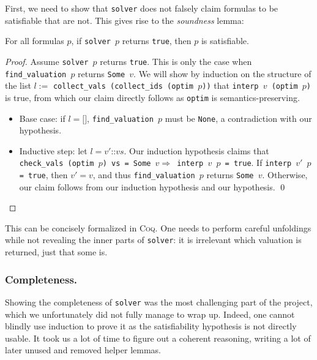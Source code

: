 First, we need to show that \texttt{solver} does not falsely claim formulas to be satisfiable that are not.
This gives rise to the \emph{soundness} lemma:
\begin{lemma}
    For all formulas $p$, if \texttt{solver $p$} returns \texttt{true}, then $p$ is satisfiable.
\end{lemma}
\begin{proof}
    Assume \texttt{solver $p$} returns \texttt{true}.
    This is only the case when \texttt{find\_valuation $p$} returns \texttt{Some $v$}.
    We will show by induction on the structure of the list $l :=$ \texttt{collect\_vals (collect\_ids (optim $p$))} that \texttt{interp $v$ (optim $p$)} is true, from which our claim directly follows as \texttt{optim} is semantics-preserving.
    \begin{itemize}
        \item Base case: if $l = \texttt{[]}$, \texttt{find\_valuation $p$} must be \texttt{None}, a contradiction with our hypothesis.
        \item Inductive step: let $l = \texttt{$v'$::$vs$}$.
        Our induction hypothesis claims that \texttt{check\_vals (optim $p$) vs = Some $v \Longrightarrow$ interp $v$ $p$ = true}.
        If \texttt{interp $v'$ $p$ = true}, then $v' = v$, and thus \texttt{find\_valuation $p$} returns \texttt{Some $v$}.
        Otherwise, our claim follows from our induction hypothesis and our hypothesis. \qed
    \end{itemize}
\end{proof}
This can be concisely formalized in \textsc{Coq}.
One needs to perform careful unfoldings while not revealing the inner parts of \texttt{solver}: it is irrelevant which valuation is returned, just that some is.

\subsubsection{Completeness.}

Showing the completeness of \texttt{solver} was the most challenging part of the project, which we unfortunately did not fully manage to wrap up.
Indeed, one cannot blindly use induction to prove it as the satisfiability hypothesis is not directly usable.
It took us a lot of time to figure out a coherent reasoning, writing a lot of later unused and removed helper lemmas.

